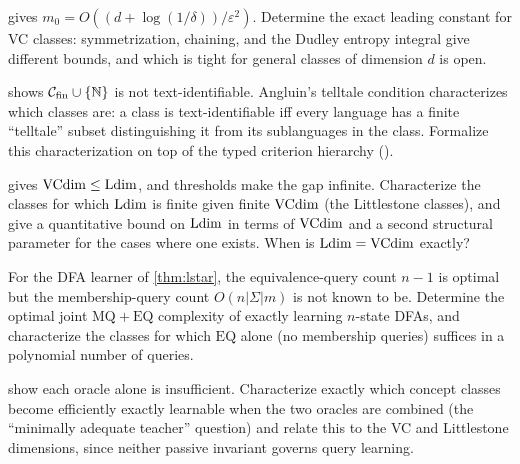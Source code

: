 \begin{openprob}
\label{op:uc-constant}
 gives $m_0 = O((d + \log(1/\delta))/\varepsilon^2)$. Determine the exact leading constant for VC classes: symmetrization, chaining, and the Dudley entropy integral give different bounds, and which is tight for general classes of dimension $d$ is open.
\end{openprob}

\begin{openprob}
\label{op:text-char}
 shows $\mathcal{C}_{\mathrm{fin}} \cup \{\mathbb{N}\}$ is not text-identifiable. Angluin's telltale condition characterizes which classes are: a class is text-identifiable iff every language has a finite ``telltale'' subset distinguishing it from its sublanguages in the class. Formalize this characterization on top of the typed criterion hierarchy ().
\end{openprob}

\begin{openprob}
\label{op:vc-ldim-gap}
 gives $\mathrm{VCdim} \leq \mathrm{Ldim}$, and thresholds make the gap infinite. Characterize the classes for which $\mathrm{Ldim}$ is finite given finite $\mathrm{VCdim}$ (the Littlestone classes), and give a quantitative bound on $\mathrm{Ldim}$ in terms of $\mathrm{VCdim}$ and a second structural parameter for the cases where one exists. When is $\mathrm{Ldim} = \mathrm{VCdim}$ exactly?
\end{openprob}

\begin{openprob}
\label{op:query-complexity}
For the DFA learner of \cref{thm:lstar}, the equivalence-query count $n-1$ is optimal but the membership-query count $O(n|\Sigma| m)$ is not known to be. Determine the optimal joint $\mathrm{MQ} + \mathrm{EQ}$ complexity of exactly learning $n$-state DFAs, and characterize the classes for which $\mathrm{EQ}$ alone (no membership queries) suffices in a polynomial number of queries.
\end{openprob}

\begin{openprob}
\label{op:mat}
 show each oracle alone is insufficient. Characterize exactly which concept classes become efficiently exactly learnable when the two oracles are combined (the ``minimally adequate teacher'' question) and relate this to the VC and Littlestone dimensions, since neither passive invariant governs query learning.
\end{openprob}

